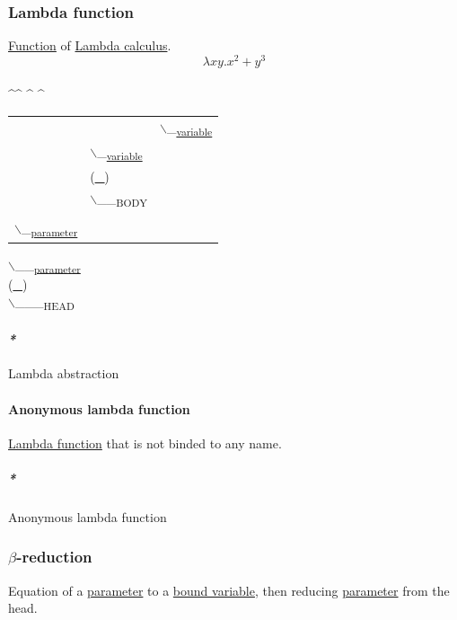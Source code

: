 \documentclass[11pt]{article}
\begin{document}
\subsubsection{\label{org496f5c2}Lambda function}
\label{sec:org8dacbbc}
\hyperref[orgeb5cddb]{Function} of \hyperref[org617da6f]{Lambda calculus}.\\
$$ \lambda x y.x^2 + y^3 $$\\
 \^{}\^{} \^{}    \^{}\\
\begin{center}
\begin{tabular}{lll}
 &  & $\backslash$_\textsubscript{\hyperref[org301bab5]{variable}}\\
 & $\backslash$_\textsubscript{\hyperref[org301bab5]{variable}}\\
 & (\uline{\uline{\_}})\\
 & $\backslash$_\_\textsubscript{BODY}\\
\\
$\backslash$_\textsubscript{\hyperref[org45d4a16]{parameter}}\\
\end{tabular}
\end{center}
  $\backslash$_\_\textsubscript{\hyperref[org45d4a16]{parameter}}\\
(\uline{\_})\\
   $\backslash$_\_\_\textsubscript{HEAD}\\

\paragraph{\emph{*}}
\label{sec:orgfaf5373}

\label{orgeed9735}Lambda abstraction\\

\paragraph{\label{orgd0363e2}Anonymous lambda function}
\label{sec:orgc9ec995}
\hyperref[org496f5c2]{Lambda function} that is not binded to any name.\\

\subparagraph{\emph{*}}
\label{sec:org6af4506}

\label{orgb943fb3}Anonymous lambda function\\

\subsubsection{\label{orgf583adb}\(\beta\)-reduction}
\label{sec:org1102479}
Equation of a \hyperref[org45d4a16]{parameter} to a \hyperref[orgb0a8362]{bound variable}, then reducing \hyperref[org45d4a16]{parameter} from the head.\\
\end{document}
